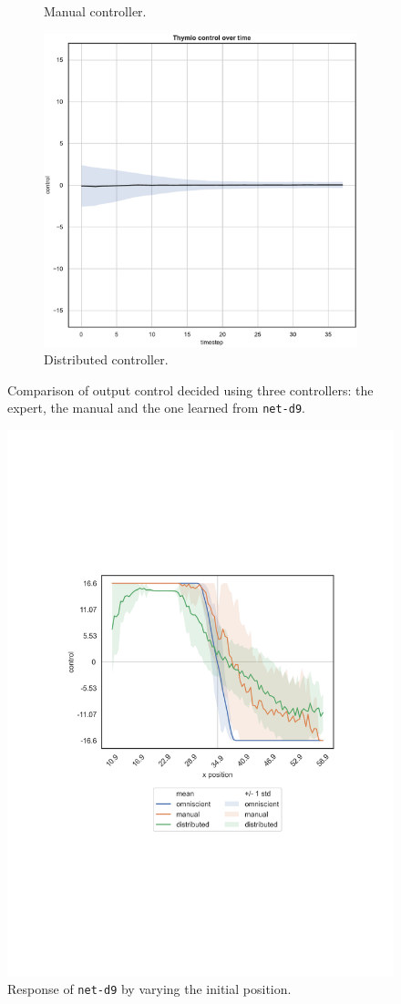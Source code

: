 \begin{figure}[!htb]
\begin{subfigure}[h]{0.3\textwidth}
		\caption{Manual controller.}
	\end{subfigure}
	\hfill
	\begin{subfigure}[h]{0.3\textwidth}
		\centering
		\includegraphics[width=\textwidth]{contents/images/net-d9/control-overtime-learned_distributed}
		\caption{Distributed controller.}
	\end{subfigure}
	\caption[Evaluation of the control decided by \texttt{net-d9}.]{Comparison 
		of output control decided using three controllers: the expert, the manual 
		and the one learned from \texttt{net-d9}.}
	\label{fig:net-d9control}
\end{figure}


\begin{figure}[!htb]
	\centering
	\includegraphics[width=.45\textwidth]{contents/images/net-d9/response-varying_init_position-distributed}%
	\caption{Response of \texttt{net-d9} by varying the initial position.}
	\label{fig:net-d9responseposition}
\end{figure}


